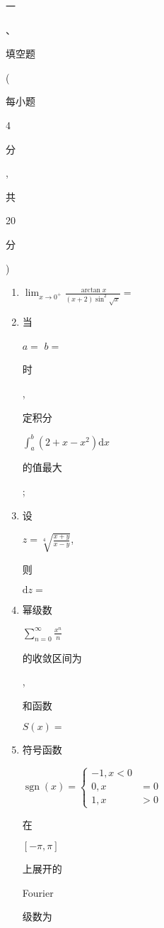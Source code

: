 \documentclass[10pt]{article}
\begin{document}
\begin{CJK}{UTF8}{mj}一\end{CJK}、\begin{CJK}{UTF8}{mj}填空题\end{CJK}(\begin{CJK}{UTF8}{mj}每小题\end{CJK} 4 \begin{CJK}{UTF8}{mj}分\end{CJK}, \begin{CJK}{UTF8}{mj}共\end{CJK} 20 \begin{CJK}{UTF8}{mj}分\end{CJK})

\begin{enumerate}
  \item $\lim _{x \rightarrow 0^{+}} \frac{\arctan x}{(x+2) \sin ^{2} \sqrt{x}}=$

  \item \begin{CJK}{UTF8}{mj}当\end{CJK} $a=$ $b=$ \begin{CJK}{UTF8}{mj}时\end{CJK}, \begin{CJK}{UTF8}{mj}定积分\end{CJK} $\int_{a}^{b}\left(2+x-x^{2}\right) \mathrm{d} x$ \begin{CJK}{UTF8}{mj}的值最大\end{CJK};

  \item \begin{CJK}{UTF8}{mj}设\end{CJK} $z=\sqrt[4]{\frac{x+y}{x-y}}$, \begin{CJK}{UTF8}{mj}则\end{CJK} $\mathrm{d} z=$

  \item \begin{CJK}{UTF8}{mj}幂级数\end{CJK} $\sum_{n=0}^{\infty} \frac{x^{n}}{n}$ \begin{CJK}{UTF8}{mj}的收敛区间为\end{CJK} , \begin{CJK}{UTF8}{mj}和函数\end{CJK} $S(x)=$

  \item \begin{CJK}{UTF8}{mj}符号函数\end{CJK} $\operatorname{sgn}(x)=\left\{\begin{aligned}-1, x<0 \\ 0, x &=0 \\ 1, x &>0 \end{aligned}\right.$ \begin{CJK}{UTF8}{mj}在\end{CJK} $[-\pi, \pi]$ \begin{CJK}{UTF8}{mj}上展开的\end{CJK} Fourier \begin{CJK}{UTF8}{mj}级数为\end{CJK}

\end{enumerate}
\end{document}
